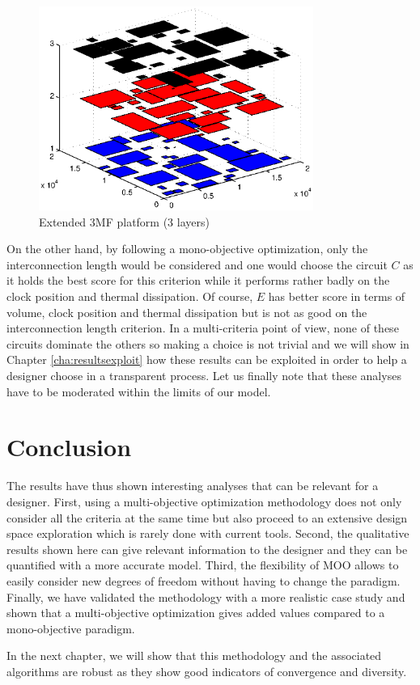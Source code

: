 \begin{figure}[h!]
\begin{center}
\includegraphics[width=0.8\textwidth]{valid3lmandist.eps}
\caption{Extended 3MF platform (3 layers)}
\label{fig:valid3lmandist}
\end{center}
\end{figure}

On the other hand, by following a mono-objective optimization, only the interconnection length would be considered and one would choose the circuit $C$ as it holds the best score for this criterion while it performs rather badly on the clock position and thermal dissipation. Of course, $E$ has better score in terms of volume, clock position and thermal dissipation but is not as good on the interconnection length criterion. In a multi-criteria point of view, none of these circuits dominate the others so making a choice is not trivial and we will show in Chapter \ref{cha:resultsexploit} how these results can be exploited in order to help a designer choose in a transparent process. Let us finally note that these analyses have to be moderated within the limits of our model.

\section{Conclusion}

The results have thus shown interesting analyses that can be relevant for a designer. First, using a multi-objective optimization methodology does not only consider all the criteria at the same time but also proceed to an extensive design space exploration which is rarely done with current tools. Second, the qualitative results shown here can give relevant information to the designer and they can be quantified with a more accurate model. Third, the flexibility of MOO allows to easily consider new degrees of freedom without having to change the paradigm. Finally, we have validated the methodology with a more realistic case study and shown that a multi-objective optimization gives added values compared to a mono-objective paradigm.

In the next chapter, we will show that this methodology and the associated algorithms are robust as they show good indicators of convergence and diversity.